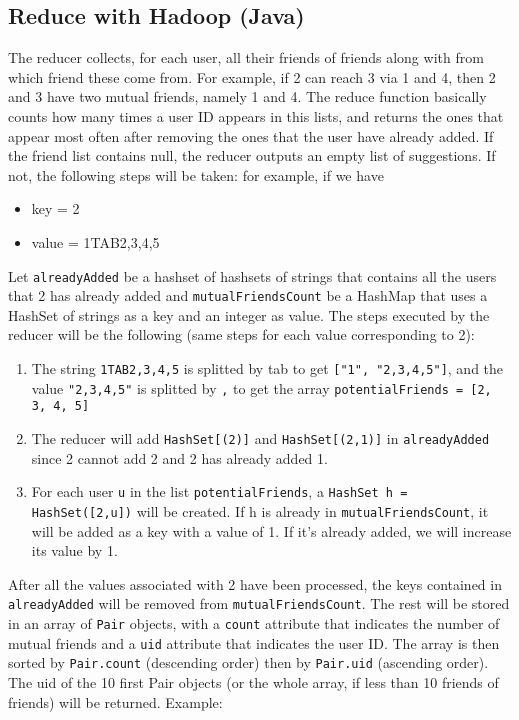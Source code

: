 \documentclass[11pt]{article}
\begin{document}
\begin{justifying}
\section{Reduce with Hadoop (Java)}
The reducer collects, for each user, all their friends of friends along with from which friend these come from. For example, if 2 can reach 3 via 1 and 4, then 2 and 3 have two mutual friends, namely 1 and 4. The reduce function basically counts how many times a user ID appears in this lists, and returns the ones that appear most often after removing the ones that the user have already added. If the friend list contains null, the reducer outputs an empty list of suggestions. If not, the following steps will be taken: for example, if we have
\begin{itemize}
    \item key \space \space \space = 2
    \item value = 1TAB2,3,4,5
\end{itemize}
Let \verb|alreadyAdded| be a hashset of hashsets of strings that contains all the users that 2 has already added and \verb|mutualFriendsCount| be a HashMap that uses a HashSet of strings as a key and an integer as value. The steps executed by the reducer will be the following (same steps for each value corresponding to 2):
\begin{enumerate}
    \item The string \verb|1TAB2,3,4,5| is splitted by tab to get \verb|["1", "2,3,4,5"]|, and the value \verb|"2,3,4,5"| is splitted by \verb|,| to get the array \verb|potentialFriends = [2, 3, 4, 5]|
    \item The reducer will add \verb|HashSet[(2)]| and \verb|HashSet[(2,1)]| in \verb|alreadyAdded| since 2 cannot add 2 and 2 has already added 1.
    \item  For each user \verb|u| in the list \verb|potentialFriends|, a \verb|HashSet h = HashSet([2,u])| will be created. If h is already in \verb|mutualFriendsCount|, it will be added as a key with a value of 1. If it's already added, we will increase its value by 1.
\end{enumerate}
After all the values associated with 2 have been processed, the keys contained in \verb|alreadyAdded| will be removed from \verb|mutualFriendsCount|. The rest will be stored in an array of \verb|Pair| objects, with a \verb|count| attribute that indicates the number of mutual friends and a \verb|uid| attribute that indicates the user ID. The array is then sorted by \verb|Pair.count| (descending order) then by \verb|Pair.uid| (ascending order). The uid of the 10 first Pair objects (or the whole array, if less than 10 friends of friends) will be returned. Example:

\end{justifying}
\end{document}
